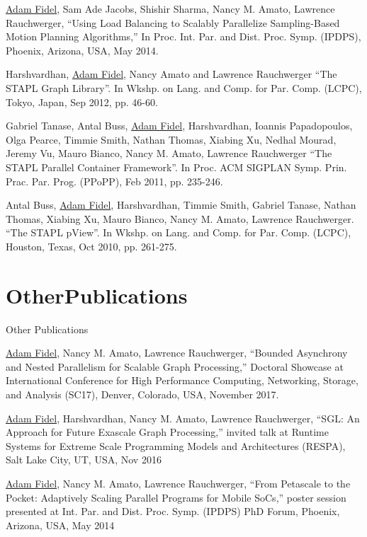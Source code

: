 \documentclass[a4paper,10pt,oneside]{article}
\begin{document}
\begin{body}
\EntryGap

{\underline{Adam Fidel}, Sam Ade Jacobs, Shishir Sharma, Nancy M. Amato, Lawrence Rauchwerger, ``Using Load Balancing to Scalably Parallelize Sampling-Based Motion Planning Algorithms,'' In Proc. Int. Par. and Dist. Proc. Symp. (IPDPS), Phoenix, Arizona, USA, May 2014.}

\EntryGap

{Harshvardhan, \underline{Adam Fidel}, Nancy Amato and Lawrence Rauchwerger ``The STAPL Graph Library''. In Wkshp. on Lang. and Comp. for Par. Comp. (LCPC), Tokyo, Japan, Sep 2012, pp. 46-60.}

\EntryGap

{Gabriel Tanase, Antal Buss, \underline{Adam Fidel}, Harshvardhan, Ioannis Papadopoulos, Olga Pearce, Timmie Smith, Nathan Thomas, Xiabing Xu, Nedhal Mourad, Jeremy Vu, Mauro Bianco, Nancy M. Amato, Lawrence Rauchwerger ``The STAPL Parallel Container Framework''. In Proc. ACM SIGPLAN Symp. Prin. Prac. Par. Prog. (PPoPP), Feb 2011, pp. 235-246.}

\EntryGap

{Antal Buss, \underline{Adam Fidel}, Harshvardhan, Timmie Smith, Gabriel Tanase, Nathan Thomas, Xiabing Xu, Mauro Bianco, Nancy M. Amato, Lawrence Rauchwerger. ``The STAPL pView''. In Wkshp. on Lang. and Comp. for Par. Comp. (LCPC), Houston, Texas, Oct 2010, pp. 261-275.}

\EntryGap

\section{OtherPublications}
{Other Publications}

{\underline{Adam Fidel}, Nancy M. Amato, Lawrence Rauchwerger, ``Bounded Asynchrony and Nested Parallelism for Scalable Graph Processing,''
Doctoral Showcase at International Conference for High Performance Computing, Networking, Storage, and Analysis (SC17), Denver, Colorado, USA, November 2017.}

\EntryGap

{\underline{Adam Fidel}, Harshvardhan, Nancy M. Amato, Lawrence Rauchwerger, ``SGL: An Approach for Future Exascale Graph Processing,''
invited talk at Runtime Systems for Extreme Scale Programming Models and Architectures (RESPA), Salt Lake City, UT, USA, Nov 2016}

\EntryGap

{\underline{Adam Fidel}, Nancy M. Amato, Lawrence Rauchwerger, ``From Petascale to the Pocket: Adaptively Scaling Parallel Programs for Mobile SoCs,'' poster
session presented at Int. Par. and Dist. Proc. Symp. (IPDPS) PhD Forum, Phoenix, Arizona, USA, May 2014}


\end{body}
\end{document}
